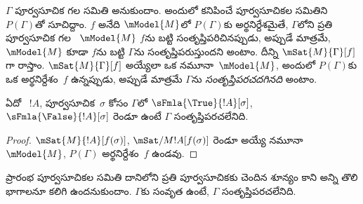 \documentclass[../../../include/open-logic-section]{subfiles}
\begin{document}
\begin{defn}
  $\Gamma$ పూర్వసూచిక గల 
  సమితి అనుకుందాం. అందులో కనిపించే పూర్వసూచికల సమితిని
  $P(\Gamma)$తో సూచిద్దాం. $f$ అనేది $\mModel{M}$లో
  $P(\Gamma)$కు అర్థనిర్దేశమైతే, $\Gamma$లోని ప్రతి
  పూర్వసూచిక గల ~$\mModel{M}$
  $f$ను బట్టి సంతృప్తిపరిచినప్పుడు, అప్పుడే మాత్రమే, $\mModel{M}$ కూడా $f$ను బట్టి
  $\Gamma$ను సంతృప్తిపరుస్తుందని అంటాం. దీన్ని $\mSat{M}{\Gamma}[f]$గా రాస్తాం.
  $\mSat{M}{\Gamma}[f]$ అయ్యేలా ఒక నమూనా~$\mModel{M}$, అందులో
  $P(\Gamma)$కు ఒక అర్థనిర్దేశం~$f$ ఉన్నప్పుడు, అప్పుడే మాత్రమే
  $\Gamma$ను \emph{సంతృప్తిపరచదగినది} అంటాం.
\end{defn}

\begin{prop}
  ఏదో ~$!A$,
  పూర్వసూచిక~$\sigma$ కోసం $\Gamma$లో
  $\sFmla{\True}{!A}[\sigma]$, $\sFmla{\False}{!A}[\sigma]$
  రెండూ ఉంటే $\Gamma$ సంతృప్తిపరచలేనిది.
\end{prop}

\begin{proof}
  $\mSat{M}{!A}[f(\sigma)]$,
  $\mSat/{M}{!A}[f(\sigma)]$ రెండూ అయ్యే నమూనా~$\mModel{M}$,
  $P(\Gamma)$ అర్థనిర్దేశం~$f$ ఉండవు.
\end{proof}

\begin{thm}[నిర్దుష్టత]
  ప్రారంభ పూర్వసూచికల సమితి దానిలోని ప్రతి పూర్వసూచికకు
  చెందిన శూన్యం కాని అన్ని తొలి భాగాలనూ కలిగి ఉందనుకుందాం.
  $\Gamma$కు సంవృత  ఉంటే,
  $\Gamma$ సంతృప్తిపరచలేనిది.
\end{thm}
\end{document}
